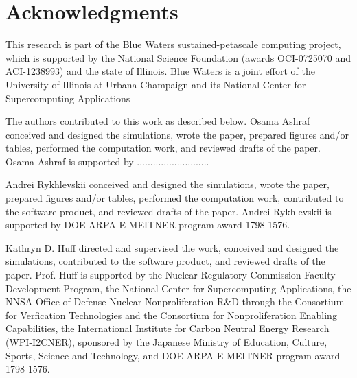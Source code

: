 \section{Acknowledgments}

This research is part of the Blue Waters sustained-petascale computing project, 
which is supported by the National Science Foundation (awards OCI-0725070 and 
ACI-1238993) and the state of Illinois. Blue Waters is a joint effort of the 
University of Illinois at Urbana-Champaign and its National Center for 
Supercomputing Applications 

The authors contributed to this work as described below. Osama Ashraf
conceived and designed the simulations, wrote the paper, prepared figures 
and/or tables, performed the computation work, and reviewed drafts of the paper. Osama Ashraf
is supported by ...........................

Andrei Rykhlevskii conceived and designed the simulations, wrote the paper, prepared figures 
and/or tables, performed the computation work, contributed to the software 
product, and reviewed drafts of the paper. Andrei Rykhlevskii 
is supported by DOE ARPA-E MEITNER program award 1798-1576. 

Kathryn D. Huff directed and supervised the work, conceived and designed the simulations, contributed to the software product, and reviewed drafts of the paper.  Prof. Huff is supported by the Nuclear Regulatory Commission Faculty Development Program, the National Center for Supercomputing Applications, the NNSA Office of Defense Nuclear Nonproliferation R\&D through the Consortium for Verfication Technologies and the Consortium for Nonproliferation Enabling Capabilities,  the International Institute for Carbon Neutral Energy Research (WPI-I2CNER), 
sponsored by the Japanese Ministry of Education, Culture, Sports, Science and Technology, and DOE ARPA-E MEITNER program award 1798-1576. 

